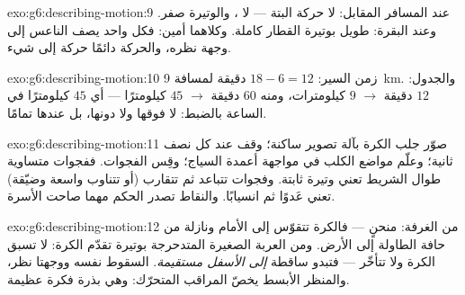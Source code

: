 \begin{solution}{exo:g6:describing-motion:9}
عند المسافر المقابل: لا حركة البتة --- لا ، والوتيرة صفر.
وعند البقرة:  طويل بوتيرة القطار كاملة. وكلاهما
أمين: فكل واحد يصف الناعس  إلى وجهة نظره، والحركة دائمًا
حركة  إلى شيء.
\end{solution}

\begin{solution}{exo:g6:describing-motion:10}
زمن السير: $18 - 6 = 12$ دقيقة لمسافة \qty{9}{km}. والجدول: $12$
دقيقة $\to$ $9$ كيلومترات، ومنه $60$ دقيقة $\to$ $45$ كيلومترًا ---
أي $45$ كيلومترًا في الساعة بالضبط: لا فوقها ولا دونها، بل
عندها تمامًا.
\end{solution}

\begin{solution}{exo:g6:describing-motion:11}
صوّر جلب الكرة بآلة تصوير ساكنة؛ وقف عند كل نصف ثانية؛ وعلّم
مواضع الكلب في مواجهة أعمدة السياج؛ وقِس الفجوات. ففجوات
متساوية طوال الشريط تعني وتيرة ثابتة. وفجوات تتباعد ثم تتقارب
(أو تتناوب واسعة وضيّقة) تعني عَدوًا ثم انسيابًا. والنقاط تصدر
الحكم مهما صاحت الأسرة.
\end{solution}

\begin{solution}{exo:g6:describing-motion:12}
من الغرفة: منحنٍ --- فالكرة تتقوّس إلى الأمام ونازلة من حافة
الطاولة إلى الأرض. ومن العربة الصغيرة المتدحرجة بوتيرة تقدّم
الكرة: لا تسبق الكرة ولا تتأخّر --- فتبدو ساقطة \emph{إلى
الأسفل مستقيمة}. السقوط نفسه ووجهتا نظر، والمنظر الأبسط يخصّ
المراقب المتحرّك: وهي بذرة فكرة عظيمة.
\end{solution}


